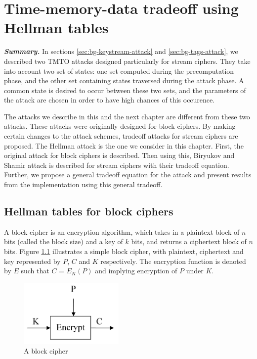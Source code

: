 \chapter{Time-memory-data tradeoff using Hellman tables}
\label{chapter:tmdto-hellman}

\indent \textbf{\textit{Summary.}} In sections \ref{sec:bg-keystream-attack} and \ref{sec:bg-tags-attack}, we described two TMTO attacks designed particularly for stream ciphers. They take into account two set of states: one set computed during the precomputation phase, and the other set containing states traversed during the attack phase. A common state is desired to occur between these two sets, and the parameters of the attack are chosen in order to have high chances of this occurence.

The attacks we describe in this and the next chapter are different from these two attacks. These attacks were originally designed for block ciphers. By making certain changes to the attack schemes, tradeoff attacks for stream ciphers are proposed. The Hellman attack is the one we consider in this chapter. First, the original attack for block ciphers is described. Then using this, Biryukov and Shamir attack is described for stream ciphers with their tradeoff equation. Further, we propose a general tradeoff equation for the attack and present results from the implementation using this general tradeoff.

\section{Hellman tables for block ciphers}

A block cipher is an encryption algorithm, which takes in a plaintext block of $n$ bits (called the block size) and a key of $k$ bits, and returns a ciphertext block of $n$ bits. Figure \ref{fig:block-cipher} illustrates a simple block cipher, with plaintext, ciphertext and key represented by $P$, $C$ and $K$ respectively. The encryption function is denoted by $E$ such that $C$ = $E_K(P)$ and implying encryption of $P$ under $K$.

\begin{figure}[ht!]
	\centering
		\includegraphics[width=2in]{./figures/block-cipher.PNG}
	\caption{A block cipher}	
	\label{fig:block-cipher}
\end{figure}

